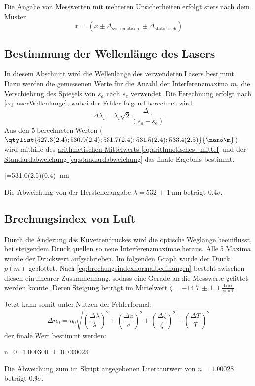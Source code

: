 \clearpage
Die Angabe von Messwerten mit mehreren Unsicherheiten erfolgt stets nach dem Muster \[x=(x\pm\Delta_\text{systematisch.}\pm\Delta_\text{statistisch})\]
\subsection[Berechnung der Wellenlänge]{Bestimmung der Wellenlänge des Lasers}
\label{sec:A1}
In diesem Abschnitt wird die Wellenlänge des verwendeten Lasers bestimmt. Dazu werden die gemessenen Werte für die Anzahl der Interferenzmaxima \(m\), die Verschiebung des Spiegels von \(s_a\) nach \(s_e\) verwendet. Die Berechnung erfolgt nach \cref{eq:laserWellenlange}, wobei der Fehler folgend berechnet wird:
\begin{equation}
    \Delta \lambda_i = \lambda_i \sqrt{2}\frac{\Delta_{s_i}}{\left(s_{a} - s_{e}\right)}
\end{equation}
Aus den 5 berechneten Werten (\(\qtylist{527.3(2.4);530.9(2.4);531.7(2.4);531.5(2.4);533.4(2.5)}{\nano\m}\)) wird mithilfe des \href{eq:arithmetisches_mittel}{arithmetischen Mittelwerts \ref*{eq:arithmetisches_mittel}} und der \href{eq:standardabweichung}{Standardabweichung \ref*{eq:standardabweichung}} das finale Ergebnis bestimmt. 
\begin{rb}
    \bar{\lambda}=\qty{531.0(2.5)(0.4)}{\nano\m}
\end{rb}
Die Abweichung von der Herstellerangabe \(\lambda=\qty{532(1)}{\nano\m}\) beträgt \(\num{0.4}\sigma\).

\subsection{Brechungsindex von Luft}
Durch die Änderung des Küvettendruckes wird die optische Weglänge beeinflusst, bei steigendem Druck quellen so neue Interferenzmaximae heraus. Alle 5 Maxima wurde der Druckwert aufgschrieben. Im folgenden Graph wurde der Druck \(p(m)\) geplottet. Nach \cref{eq:brechungsindexnormalbedinungen} besteht zwischen diesen ein linearer Zusammenhang, sodass eine Gerade an die Messwerte gefittet werden konnte. Deren Steigung beträgt im Mittelwert \(\zeta=\num{-14.7(1.1)}\,\mathrm{\frac{Torr}{count}}\).

Jetzt kann somit unter Nutzen der Fehlerformel:
\begin{equation}
    \Delta n_0=n_0\sqrt{\left(\frac{\Delta  \lambda}{\lambda}\right)^2+\left(\frac{\Delta a}{a}\right)^2+\left(\frac{\Delta \zeta}{\zeta}\right)^2+\left(\frac{\Delta T}{T}\right)^2}
\end{equation}
der finale Wert bestimmt werden:
\begin{rb}
    n_0=\num{1.000300(0.000023)}
\end{rb}
Die Abweichung zum im Skript\autocite{Skript_2.1} angegebenen Literaturwert von \(n=\num{1.00028}\) beträgt \(\num{0.9}\sigma\). 


